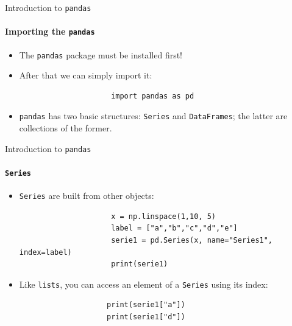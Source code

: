 \documentclass[notes,11pt, aspectratio=169, xcolor=table]{beamer}
\begin{document}
        \begin{frame}[fragile=singleslide]{Introduction to \texttt{pandas}}
        \framesubtitle{Importing the \texttt{pandas}}
            
             \begin{itemize}
    
                \item The \texttt{pandas} package must be installed first!
                
                \item After that we can simply import it:
    
                    \begin{verbatim}
                     import pandas as pd
                    \end{verbatim}
                    
                \item \texttt{pandas} has two basic structures: \texttt{Series} and \texttt{DataFrames}; the latter are collections of the former.
                    
            \end{itemize}             
    
        \end{frame}
        
        \begin{frame}[fragile=singleslide]{Introduction to \texttt{pandas}}
        \framesubtitle{\texttt{Series}}
            
             \begin{itemize}
    
                \item \texttt{Series} are built from other objects:
    
                    \begin{verbatim}
                     x = np.linspace(1,10, 5)
                     label = ["a","b","c","d","e"]
                     serie1 = pd.Series(x, name="Series1", index=label)
                     print(serie1)
                    \end{verbatim}
                    
                \item Like \texttt{lists}, you can access an element of a \texttt{Series} using its index:
                
                \begin{verbatim}
                    print(serie1["a"])
                    print(serie1["d"])
                \end{verbatim}
                
                    
            \end{itemize}             
    
        \end{frame}    
\end{document}
